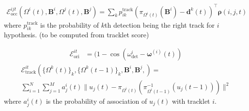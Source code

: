 \documentclass{beamer} %
\newcommand{\ori}[2]{\mathbf{\omega}^{(#1)}(#2)}
\newcommand{\relp}[2]{\Omega^{#1}(#2)}
\newcommand{\trackp}[1]{u_{j}(#1)}
\newcommand{\projectionOfi}[2]{\pi_{\relp{#1}{t}}(#2)}
\newcommand{\projectionOf}[1]{\projectionOfi{i}{#1}}
\newcommand{\invProjectionOf}[1]{\pi^{-1}_{\relp{i}{t-1}}(#1)}
\newcommand{\dimsn}[1]{\mathbf{B}^{#1}}
\newcommand{\bb}[1]{\mathbf{d}^{#1}(t)}
\newcommand{\Energy}[1]{\mathcal{E}^{it}_{\text{#1}}}
\newcommand{\pEnergy}[1]{\mathcal{E}^{ijt}_{\text{#1}}}
\begin{document}
\begin{frame}
  \begin{multline}
    \pEnergy{occ}(\relp{i}{t}, \dimsn{i}, \relp{j}{t}, \dimsn{j}) =
    \sum_kp_{ik}^{\text{track}}(\projectionOf{\dimsn{i}} - \bb{k})^\top \pmb{\rho}(i,j,t)
  \end{multline}
  where $p_{ik}^{\text{track}}$ is the probability of $k$th detection being the
  right track for $i$ hypothesis. (to be computed from tracklet score)
\end{frame}

\begin{frame}
  \begin{align}
    \Energy{ori} &= 
    (1 - \cos({\omega}^i_{\text{det}} - \ori{i}{t})
  \end{align}
  \pause
  \begin{multline}
    \Energy{track}(\{ \relp{k}{t} \}_k, \{ \relp{k}{t-1} \}_k, \dimsn{i},
    \dimsn{j}, ) = \\
    \sum_{i=1}^{N} 
    \sum_{j = 1}^{M}
    a_j^i(t)\|\trackp{t} - \projectionOf{\invProjectionOf{\trackp{t-1}}}\|^2
  \end{multline}
  where $a_j^i(t)$ is the probability of association of $\trackp{t}$ with
  tracklet $i$.
\end{frame}
\end{document}
